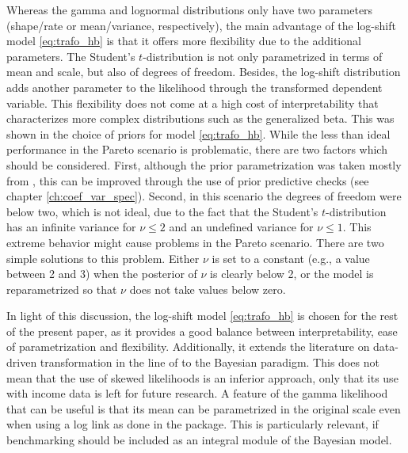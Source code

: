 Whereas the gamma and lognormal distributions only have two parameters (shape/rate or mean/variance, respectively), the main advantage of the log-shift model \ref{eq:trafo_hb} is that it offers more flexibility due to the additional parameters.
The Student's $t$-distribution is not only parametrized in terms of mean and scale, but also of degrees of freedom.
Besides, the log-shift distribution adds another parameter to the likelihood through the transformed dependent variable.
This flexibility does not come at a high cost of interpretability that characterizes more complex distributions such as the generalized beta.
This was shown in the choice of priors for model \ref{eq:trafo_hb}.
While the less than ideal performance in the Pareto scenario is problematic, there are two factors which should be considered.
First, although the prior parametrization was taken mostly from \cite{morelli_hierarchical_2021},
this can be improved through the use of prior predictive checks (see chapter \ref{ch:coef_var_spec}).
Second, in this scenario the degrees of freedom were below two, which is not ideal, due to the fact that the Student's $t$-distribution has an infinite variance for $\nu \le 2$ and an undefined variance for $\nu \le 1$.
This extreme behavior might cause problems in the Pareto scenario.
There are two simple solutions to this problem.
Either $\nu$ is set to a constant (e.g., a value between 2 and 3) when the posterior of $\nu$ is clearly below 2, or the model is reparametrized so that $\nu$ does not take values below zero.


In light of this discussion, the log-shift model \ref{eq:trafo_hb} is chosen for the rest of the present paper, as it provides a good balance between interpretability, ease of parametrization and flexibility.
Additionally, it extends the literature on data-driven transformation in the line of \cite{rojas_perilla_data_2020} to the Bayesian paradigm.
This does not mean that the use of skewed likelihoods is an inferior approach, only that its use with income data is left for future research.
A feature of the gamma likelihood that can be useful is that its mean can be parametrized in the original scale even when using a log link as done in the  package.
This is particularly relevant, if benchmarking \citep{pfeffermann_new_2013} should be included as an integral module of the Bayesian model.

